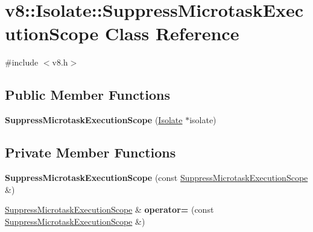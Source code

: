 \hypertarget{classv8_1_1_isolate_1_1_suppress_microtask_execution_scope}{}\section{v8\+:\+:Isolate\+:\+:Suppress\+Microtask\+Execution\+Scope Class Reference}
\label{classv8_1_1_isolate_1_1_suppress_microtask_execution_scope}


{\ttfamily \#include $<$v8.\+h$>$}

\subsection*{Public Member Functions}
\begin{DoxyCompactItemize}
\item 
{\bfseries Suppress\+Microtask\+Execution\+Scope} (\hyperlink{classv8_1_1_isolate}{Isolate} $\ast$isolate)\hypertarget{classv8_1_1_isolate_1_1_suppress_microtask_execution_scope_a846d7dd39f4cfad4dfc4c8c785e4a65e}{}\label{classv8_1_1_isolate_1_1_suppress_microtask_execution_scope_a846d7dd39f4cfad4dfc4c8c785e4a65e}

\end{DoxyCompactItemize}
\subsection*{Private Member Functions}
\begin{DoxyCompactItemize}
\item 
{\bfseries Suppress\+Microtask\+Execution\+Scope} (const \hyperlink{classv8_1_1_isolate_1_1_suppress_microtask_execution_scope}{Suppress\+Microtask\+Execution\+Scope} \&)\hypertarget{classv8_1_1_isolate_1_1_suppress_microtask_execution_scope_a9d8126b5ed291f0b064a3232dd081068}{}\label{classv8_1_1_isolate_1_1_suppress_microtask_execution_scope_a9d8126b5ed291f0b064a3232dd081068}

\item 
\hyperlink{classv8_1_1_isolate_1_1_suppress_microtask_execution_scope}{Suppress\+Microtask\+Execution\+Scope} \& {\bfseries operator=} (const \hyperlink{classv8_1_1_isolate_1_1_suppress_microtask_execution_scope}{Suppress\+Microtask\+Execution\+Scope} \&)\hypertarget{classv8_1_1_isolate_1_1_suppress_microtask_execution_scope_a2ecf5a136de00433029043a5061d0b9f}{}\label{classv8_1_1_isolate_1_1_suppress_microtask_execution_scope_a2ecf5a136de00433029043a5061d0b9f}

\end{DoxyCompactItemize}
